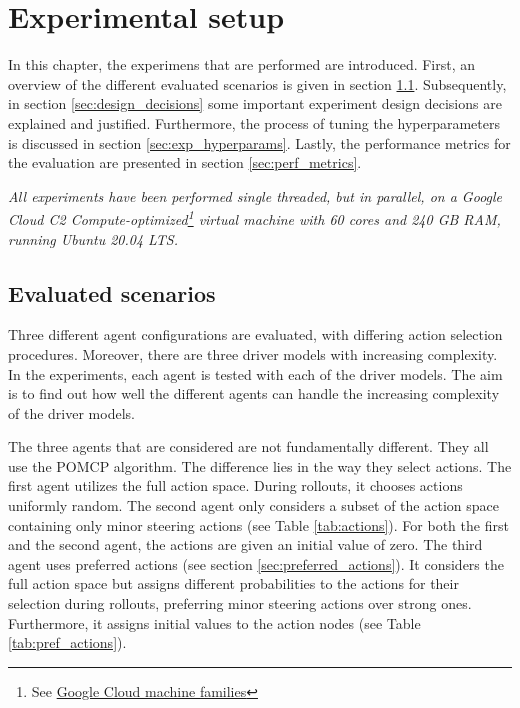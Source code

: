 \chapter{Experimental setup}
\label{ch:setup}




In this chapter, the experimens that are performed are introduced. First, an overview of the different evaluated scenarios is given in section \ref{sec:scenarios}. Subsequently, in section \ref{sec:design_decisions} some important experiment design decisions are explained and justified. Furthermore, the process of tuning the hyperparameters is discussed in section \ref{sec:exp_hyperparams}. Lastly, the performance metrics for the evaluation are presented in section \ref{sec:perf_metrics}.

\emph{All experiments have been performed single threaded, but in parallel, on a Google Cloud C2 Compute-optimized\footnote{See \href{https://cloud.google.com/compute/docs/machine-types}{Google Cloud machine families}} virtual machine with 60 cores and 240 GB RAM, running Ubuntu 20.04 LTS.}



\section{Evaluated scenarios}
\label{sec:scenarios}

Three different agent configurations are evaluated, with differing action selection procedures. Moreover, there are three driver models with increasing complexity. In the experiments, each agent is tested with each of the driver models. The aim is to find out how well the different agents can handle the increasing complexity of the driver models.

The three agents that are considered are not fundamentally different. They all use the POMCP algorithm. The difference lies in the way they select actions. The first agent utilizes the full action space. During rollouts, it chooses actions uniformly random. The second agent only considers a subset of the action space containing only minor steering actions (see Table \ref{tab:actions}). For both the first and the second agent, the actions are given an initial value of zero. The third agent uses preferred actions (see section \ref{sec:preferred_actions}). It considers the full action space but assigns different probabilities to the actions for their selection during rollouts, preferring minor steering actions over strong ones. Furthermore, it assigns initial values to the action nodes (see Table \ref{tab:pref_actions}).

